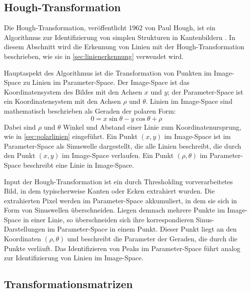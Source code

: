 
\subsection{Hough-Transformation}
\label{sec:hough_transformation}

Die Hough-Transformation, veröffentlicht 1962 von Paul Hough, ist ein Algorithmus zur Identifizierung von simplen Strukturen in Kantenbildern \cite{hough_transform,hough_transform}. In diesem Abschnitt wird die Erkennung von Linien mit der Hough-Transformation beschrieben, wie sie in \autoref{sec:linienerkennung} verwendet wird.

Hauptaspekt des Algorithmus ist die Transformation von Punkten im Image-Space zu Linien im Parameter-Space. Der Image-Space ist das Koordinatensystem des Bildes mit den Achsen $x$ und $y$; der Parameter-Space ist ein Koordinatensystem mit den Achsen $\rho$ und $\theta$. Linien im Image-Space sind mathematisch beschrieben als Geraden der polaren Form:
\[ 0 = x \sin{\theta} - y \cos{\theta} + \rho \]
Dabei sind $\rho$ und $\theta$ Winkel und Abstand einer Linie zum Koordinatenursprung, wie in \autoref{sec:polarlinien} eingeführt. Ein Punkt $(x, y)$ im Image-Space ist im Parameter-Space als Sinuswelle dargestellt, die alle Linien beschreibt, die durch den Punkt $(x, y)$ im Image-Space verlaufen. Ein Punkt $(\rho, \theta)$ im Parameter-Space beschreibt eine Linie in Image-Space.

Input der Hough-Transformation ist ein durch Thresholding vorverarbeitetes Bild, in dem typischerweise Kanten oder Ecken extrahiert wurden. Die extrahierten Pixel werden im Parameter-Space akkumuliert, in dem sie sich in Form von Sinuswellen überschneiden. Liegen demnach mehrere Punkte im Image-Space in einer Linie, so überschneiden sich ihre korrespondieren Sinus-Darstellungen im Parameter-Space in einem Punkt. Dieser Punkt liegt an den Koordinaten $(\rho, \theta)$ und beschreibt die Parameter der Geraden, die durch die Punkte verläuft. Das Identifizieren von Peaks im Parameter-Space führt analog zur Identifizierung von Linien im Image-Space.


\subsection{Transformationsmatrizen}
\label{sec:transformations_matrizen}

